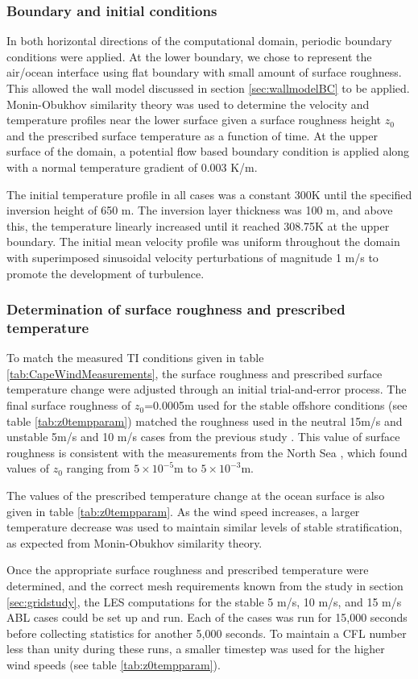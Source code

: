 \subsubsection{Boundary and initial conditions}
In both horizontal directions of the computational domain, periodic
boundary conditions were applied.  At the lower boundary, we chose to
represent the air/ocean interface using flat boundary with small
amount of surface roughness.  This allowed the wall model discussed in
section \ref{sec:wallmodelBC} to be applied.  Monin-Obukhov similarity
theory was used to determine the velocity and temperature profiles
near the lower surface given a surface roughness height $z_0$ and the
prescribed surface temperature as a function of time.  At the upper
surface of the domain, a potential flow based boundary condition is
applied along with a normal temperature gradient of 0.003 K/m.

The initial temperature profile in all cases was a constant 300K until
the specified inversion height of 650 m.  The inversion layer thickness
was 100 m, and above this, the temperature linearly increased until it
reached 308.75K at the upper boundary.  The initial mean velocity
profile was uniform throughout the domain with superimposed sinusoidal
velocity perturbations of magnitude 1 m/s to promote the development
of turbulence.

\subsubsection{Determination of surface roughness and prescribed temperature }
To match the measured TI conditions given in table
\ref{tab:CapeWindMeasurements}, the surface roughness and prescribed
surface temperature change were adjusted through an initial
trial-and-error process.  The final surface roughness of $z_0$=0.0005m
used for the stable offshore conditions (see table \ref{tab:z0tempparam})
matched the roughness used in the neutral 15m/s and unstable 5m/s and
10 m/s cases from the previous study \cite{cheung2020large}.  This
value of surface roughness is consistent with the measurements from
the North Sea \cite{taylor2001dependence}, which found values of $z_0$
ranging from $5 \times 10^{-5}$m to $5\times 10^{-3}$m.

The values of the prescribed temperature change at the ocean surface
is also given in table \ref{tab:z0tempparam}.  As the wind
speed increases, a larger temperature decrease was used to maintain
similar levels of stable stratification, as expected from
Monin-Obukhov similarity theory.

Once the appropriate surface roughness and prescribed temperature were
determined, and the correct mesh requirements known from the study in
section \ref{sec:gridstudy}, the LES computations for the stable 5 m/s,
10 m/s, and 15 m/s ABL cases could be set up and run.  Each of the cases
was run for 15,000 seconds before collecting statistics for another
5,000 seconds.  To maintain a CFL number less than unity during these
runs, a smaller timestep was used for the higher wind speeds (see
table \ref{tab:z0tempparam}).
